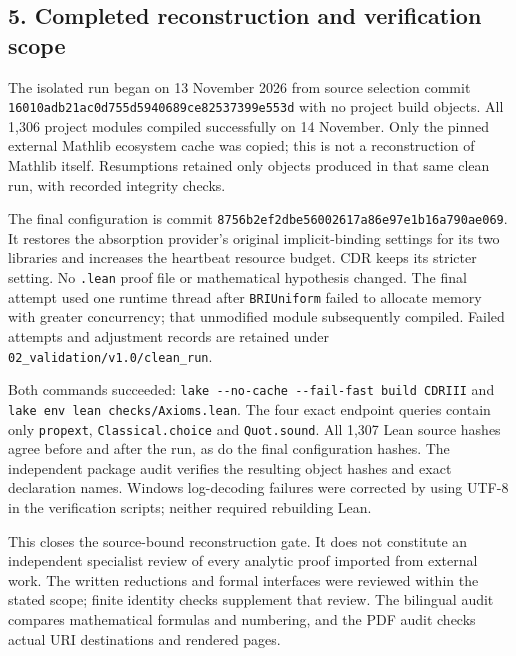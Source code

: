 \documentclass[english,11pt,a4paper]{article}
\begin{document}
\subsection{5. Completed reconstruction and verification scope}\label{completed-reconstruction-and-verification-scope}

The isolated run began on 13 November 2026 from source selection commit \texttt{16010adb\allowbreak{}21ac0d75\allowbreak{}5d594068\allowbreak{}9ce82537\allowbreak{}399e553d} with no project build objects. All 1,306 project modules compiled successfully on 14 November. Only the pinned external Mathlib ecosystem cache was copied; this is not a reconstruction of Mathlib itself. Resumptions retained only objects produced in that same clean run, with recorded integrity checks.

The final configuration is commit \texttt{8756b2ef\allowbreak{}2dbe5600\allowbreak{}2617a86e\allowbreak{}97e1b16a\allowbreak{}790ae069}. It restores the absorption provider's original implicit-binding settings for its two libraries and increases the heartbeat resource budget. CDR keeps its stricter setting. No \texttt{.\allowbreak{}lean} proof file or mathematical hypothesis changed. The final attempt used one runtime thread after \texttt{BRIUniform} failed to allocate memory with greater concurrency; that unmodified module subsequently compiled. Failed attempts and adjustment records are retained under \texttt{02\_\allowbreak{}validation/\allowbreak{}v1.\allowbreak{}0/\allowbreak{}clean\_\allowbreak{}run}.

Both commands succeeded: \texttt{lake\ -\/\allowbreak{}-no-cache\ -\/\allowbreak{}-fail-fast\ build\ CDRIII} and \texttt{lake\ env\ lean\ checks/\allowbreak{}Axioms.\allowbreak{}lean}. The four exact endpoint queries contain only \texttt{propext}, \texttt{Classical.\allowbreak{}choice} and \texttt{Quot.\allowbreak{}sound}. All 1,307 Lean source hashes agree before and after the run, as do the final configuration hashes. The independent package audit verifies the resulting object hashes and exact declaration names. Windows log-decoding failures were corrected by using UTF-8 in the verification scripts; neither required rebuilding Lean.

This closes the source-bound reconstruction gate. It does not constitute an independent specialist review of every analytic proof imported from external work. The written reductions and formal interfaces were reviewed within the stated scope; finite identity checks supplement that review. The bilingual audit compares mathematical formulas and numbering, and the PDF audit checks actual URI destinations and rendered pages.
\end{document}
